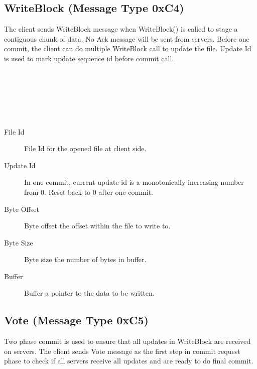 \documentclass[12pt,fleqn]{article}
\begin{document}
\subsection{WriteBlock (Message Type 0xC4)}
The client sends WriteBlock message when WriteBlock() is called to stage a contiguous chunk of data. No Ack message will be sent from servers. Before one commit, the client can do multiple WriteBlock call to update the file. Update Id is used to mark update sequence id before commit call.

\begin{center}
	\begin{bytefield}[bitwidth=1.1em]{16}
		 \\
		 \\
		 \\
		 \\
		 \\
	\end{bytefield}
\end{center}

\begin{description}
	\item[File Id] File Id for the opened file at client side.
	\item[Update Id] In one commit, current update id is a monotonically increasing number from 0. Reset back to 0 after one commit.
	\item[Byte Offset] Byte offset the offset within the file to write to.
	\item[Byte Size] Byte size the number of bytes in buffer.
	\item[Buffer] Buffer a pointer to the data to be written.
\end{description}

\subsection{Vote (Message Type 0xC5)}
Two phase commit is used to ensure that all updates in WriteBlock are received on servers. 
The client sends Vote message as the first step in commit request phase to check if all servers receive all updates and are ready to do final commit.
 
\begin{center}
	\begin{bytefield}[bitwidth=1.1em]{16}
		 \\
	\end{bytefield}
\end{center}
\end{document}

